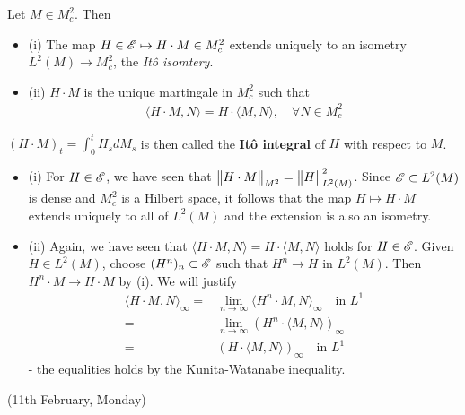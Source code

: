 \documentclass[12pt,a4paper]{article}
\newenvironment{proof}
{\begin{changemargin}{0.5cm}{0.5cm} 
	}%
	{\end{changemargin}
}
\renewenvironment{i}
{\begin{itemize} 
	}%
	{\end{itemize}
}
\newenvironment{p}
{\begin{proof} 
	}%
	{\end{proof}
}
\begin{document}
 Let $M\in M_c^2$. Then
\begin{i}
\item[(i)] The map $H\in \mathscr{E}\mapsto H\cdot M \in M_c^2$ extends uniquely to an isometry $L^2(M) \rightarrow M_c^2$, the \emph{It\^o isomtery}.
\item[(ii)] $H\cdot M$ is the unique martingale in $M_c^2$ such that
\begin{align*}
\langle H\cdot M, N \rangle = H\cdot \langle M, N\rangle, \quad \forall N \in M_c^2
\end{align*}
\end{i}
$(H\cdot M)_t = \int_0^t H_s dM_s$ is then called the \textbf{It\^o integral} of $H$ with respect to $M$.
\s

\begin{p}
\pf \begin{i}
\item[(i)] For $H\in \mathscr{E}$, we have seen that $\bigl\lVert H\cdot M\bigr\rVert_{M^2} = \bigl\lVert H\bigr\rVert_{L^2(M)}^2$. Since $\mathscr{E}\subset L^2(M)$ is dense and $M_c^2$ is a Hilbert space, it follows that the map $H\mapsto H\cdot M$ extends uniquely to all of $L^2(M)$ and the extension is also an isometry.
\item[(ii)] Again, we have seen that $\langle H \cdot M, N\rangle = H\cdot \langle M, N\rangle$ holds for $H\in \mathscr{E}$. Given $H\in L^2(M)$, choose $(H^n)_n \subset \mathscr{E}$ such that $H^n \rightarrow H$ in $L^2(M)$. Then $H^n \cdot M \rightarrow H\cdot M$ by (i). We will justify
\begin{align*}
\langle H\cdot M, N \rangle_{\infty} =& \lim_{n\rightarrow \infty} \langle H^n \cdot M, N \rangle_{\infty} \quad \text{in } L^1 \\
=& \lim_{n\rightarrow \infty} (H^n \cdot \langle M, N \rangle)_{\infty} \\
=& (H \cdot \langle M, N \rangle)_{\infty} \quad \text{in } L^1
\end{align*}
- the equalities holds by the Kunita-Watanabe inequality.
\end{i}
\end{p}
\s

\newday

(11th February, Monday)
\s
\end{document}
